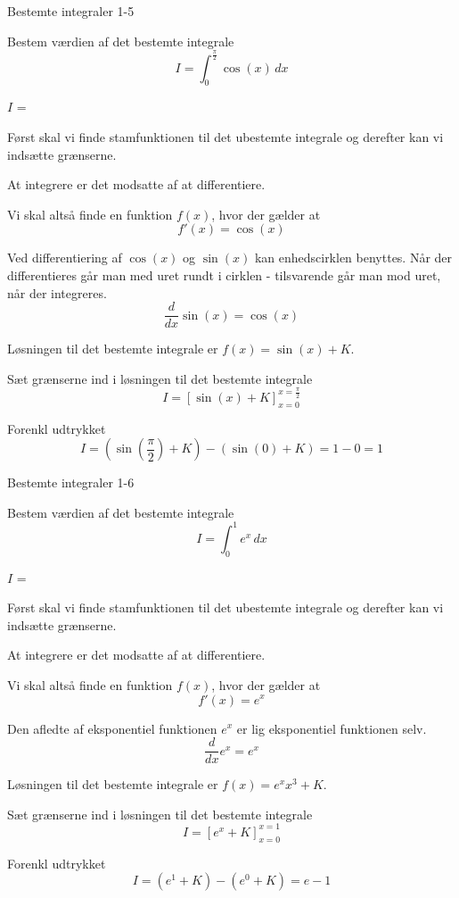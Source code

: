 \documentclass{article}
\begin{document}
\newpage

\begin{exercise}{Bestemte integraler 1-5}
	
		Bestem værdien af det bestemte integrale
	\[
	I = \int_0^{\frac{\pi}{2}} \cos(x) \, dx
	\]
	
	$I$ =  
	
	
	\hint
	Først skal vi finde stamfunktionen til det ubestemte integrale og derefter kan vi indsætte grænserne.
	
	\hint
	At integrere er det modsatte af at differentiere.
	
	\hint
	Vi skal altså finde en funktion $f(x)$, hvor der gælder at
	\[
	f'(x) = \cos(x)
	\]
	
	\hint
	Ved differentiering af $\cos(x)$ og $\sin(x)$ kan enhedscirklen benyttes. Når der differentieres går man med uret rundt i cirklen - tilsvarende går man mod uret, når der integreres. 
	\[
	\frac{d}{dx} \sin(x) = \cos(x)
	\]
	
	\hint
	Løsningen til det bestemte integrale er $f(x) = \sin(x) + K$.
	
	\hint
	Sæt grænserne ind i løsningen til det bestemte integrale
	\[
	I = \left[ \sin(x) + K \right]_{x=0}^{x=\frac{\pi}{2}}
	\]
	
	\hint
	Forenkl udtrykket
	\[
	I = \left( \sin\left(\frac{\pi}{2}\right) + K \right) - \left( \sin(0) + K \right) = 1 - 0 = 1
	\]
	
	
	
\end{exercise}

\newpage

\begin{exercise}{Bestemte integraler 1-6}
	
	Bestem værdien af det bestemte integrale
	\[
	I = \int_0^1 e^x \, dx
	\]
	
	$I$ =  
	
	
	\hint
	Først skal vi finde stamfunktionen til det ubestemte integrale og derefter kan vi indsætte grænserne.
	
	\hint
	At integrere er det modsatte af at differentiere.
	
	\hint
	Vi skal altså finde en funktion $f(x)$, hvor der gælder at
	\[
	f'(x) = e^x
	\]
	
	\hint
	Den afledte af eksponentiel funktionen $e^x$ er lig eksponentiel funktionen selv. 
	\[
	\frac{d}{dx} e^x= e^x
	\]
	
	\hint
	Løsningen til det bestemte integrale er $f(x) = e^x x^3 + K$.
	
	\hint
	Sæt grænserne ind i løsningen til det bestemte integrale
	\[
	I = \left[ e^x + K \right]_{x=0}^{x=1}
	\]
	
	\hint
	Forenkl udtrykket
	\[
	I = \left( e^1 + K \right) - \left( e^0 + K \right) = e-1
	\]
	
	
\end{exercise}
\end{document}
